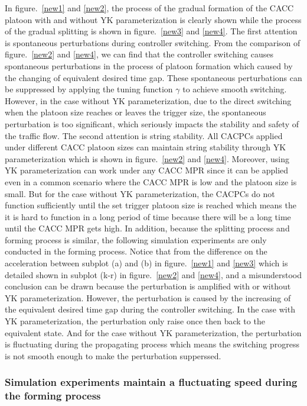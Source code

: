 \documentclass[a4paper,fleqn]{cas-sc}
\begin{document}
In figure.~\ref{new1} and \ref{new2}, the process of the gradual formation of the CACC platoon with and without YK parameterization is clearly shown while the process of the gradual splitting is shown in figure.~\ref{new3} and \ref{new4}. The first attention is spontaneous perturbations during controller switching. From the comparison of figure.~\ref{new2} and \ref{new4}, we can find that the controller switching causes spontaneous perturbations in the process of platoon formation which caused by the changing of equivalent desired time gap. These spontaneous perturbations can be suppressed by applying the tuning function $\gamma$ to achieve smooth switching. However, in the case without YK parameterization, due to the direct switching when the platoon size reaches or leaves the trigger size, the spontaneous perturbation is too significant, which seriously impacts the stability and safety of the traffic flow. The second attention is string stability. All CACPCs applied under different CACC platoon sizes can maintain string stability through YK parameterization which is shown in figure.~\ref{new2} and \ref{new4}. Moreover, using YK parameterization can work under any CACC MPR since it can be applied even in a common scenario where the CACC MPR is low and the platoon size is small. But for the case without YK parameterization, the CACPCs do not function sufficiently until the set trigger platoon size is reached  which means the it is hard to function in a long period of time because there will be a long time until the CACC MPR gets high. In addition, because the splitting process and forming process is similar, the following simulation experiments are only conducted in the forming process. Notice that from the difference on the acceleration between subplot (a) and (b) in figure.~\ref{new1} and \ref{new3} which is detailed shown in subplot (k-r) in figure.~\ref{new2} and \ref{new4}, and a misunderstood conclusion can be drawn because the perturbation is amplified with or without YK parameterization. However, the perturbation is caused by the increasing of the equivalent desired time gap during the controller switching. In the case with YK parameterization, the perturbation only raise once then back to the equivalent state. And for the case without YK parameterization, the perturbation is fluctuating during the propagating process which means the switching progress is not smooth enough to make the perturbation supperssed.

\subsubsection{Simulation experiments maintain a fluctuating speed during the forming process}
\label{Section 5.2.2}
\end{document}

